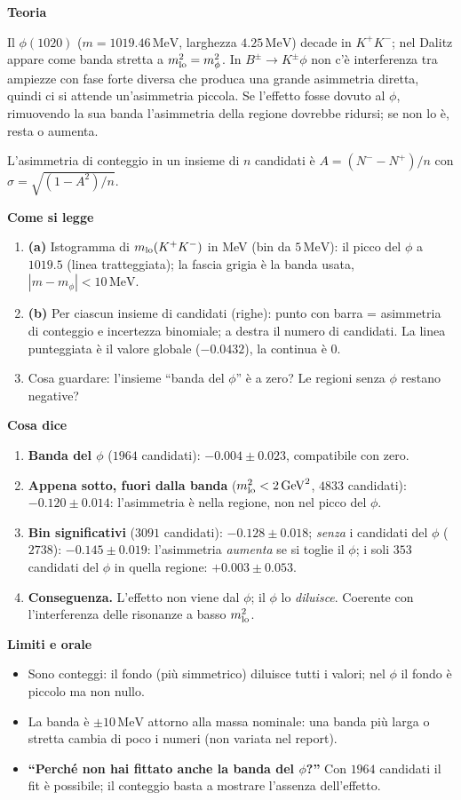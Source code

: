 \documentclass[10.5pt,a4paper]{article}
\newcommand{\MeV}{\,\mathrm{MeV}}
\newcommand{\GeV}{\,\mathrm{GeV}}
\newcommand{\sez}[1]{\par\Needspace{6\baselineskip}\medskip\noindent\textbf{\large #1}\par\nopagebreak\smallskip}
\begin{document}
\sez{Teoria}
Il $\phi(1020)$ ($m=1019.46\MeV$, larghezza $4.25\MeV$) decade in $K^+K^-$; nel Dalitz appare come banda stretta a $m^2_{\rm lo}=m_\phi^2$. In $B^\pm\to K^\pm\phi$ non c'è interferenza tra ampiezze con fase forte diversa che produca una grande asimmetria diretta, quindi ci si attende un'asimmetria piccola. Se l'effetto fosse dovuto al $\phi$, rimuovendo la sua banda l'asimmetria della regione dovrebbe ridursi; se non lo è, resta o aumenta.

L'asimmetria di conteggio in un insieme di $n$ candidati è $A=(N^--N^+)/n$ con $\sigma=\sqrt{(1-A^2)/n}$.

\sez{Come si legge}
\begin{enumerate}
\item \textbf{(a)} Istogramma di $m_{\rm lo}(K^+K^-)$ in MeV (bin da $5\MeV$): il picco del $\phi$ a $1019.5$ (linea tratteggiata); la fascia grigia è la banda usata, $|m-m_\phi|<10\MeV$.
\item \textbf{(b)} Per ciascun insieme di candidati (righe): punto con barra = asimmetria di conteggio e incertezza binomiale; a destra il numero di candidati. La linea punteggiata è il valore globale ($-0.0432$), la continua è $0$.
\item Cosa guardare: l'insieme ``banda del $\phi$'' è a zero? Le regioni senza $\phi$ restano negative?
\end{enumerate}

\sez{Cosa dice}
\begin{enumerate}
\item \textbf{Banda del $\phi$} ($1964$ candidati): $-0.004\pm0.023$, compatibile con zero.
\item \textbf{Appena sotto, fuori dalla banda} ($m^2_{\rm lo}<2\GeV^2$, $4833$ candidati): $-0.120\pm0.014$: l'asimmetria è nella regione, non nel picco del $\phi$.
\item \textbf{Bin significativi} ($3091$ candidati): $-0.128\pm0.018$; \emph{senza} i candidati del $\phi$ ($2738$): $-0.145\pm0.019$: l'asimmetria \emph{aumenta} se si toglie il $\phi$; i soli $353$ candidati del $\phi$ in quella regione: $+0.003\pm0.053$.
\item \textbf{Conseguenza.} L'effetto non viene dal $\phi$; il $\phi$ lo \emph{diluisce}. Coerente con l'interferenza delle risonanze a basso $m^2_{\rm lo}$.
\end{enumerate}

\sez{Limiti e orale}
\begin{itemize}
\item Sono conteggi: il fondo (più simmetrico) diluisce tutti i valori; nel $\phi$ il fondo è piccolo ma non nullo.
\item La banda è $\pm10\MeV$ attorno alla massa nominale: una banda più larga o stretta cambia di poco i numeri (non variata nel report).
\item \textbf{``Perché non hai fittato anche la banda del $\phi$?''} Con $1964$ candidati il fit è possibile; il conteggio basta a mostrare l'assenza dell'effetto.
\end{itemize}
\end{document}
